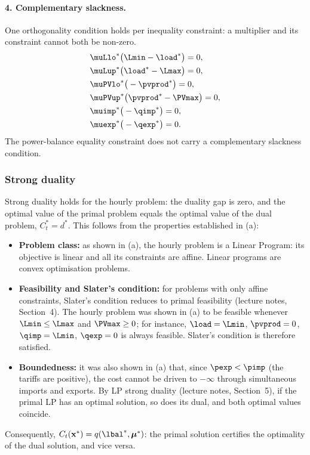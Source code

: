\paragraph{4. Complementary slackness.}
One orthogonality condition holds per inequality constraint: a multiplier and its constraint
cannot both be non-zero.
\begin{align}
    & {\muLlo}^* \big( \Lmin - {\load}^* \big) = 0, \label{eq:kkt_cs_load_lb} \\
    & {\muLup}^* \big( {\load}^* - \Lmax \big) = 0, \label{eq:kkt_cs_load_ub} \\
    & {\muPVlo}^* \big( -{\pvprod}^* \big) = 0, \label{eq:kkt_cs_pv_lb} \\
    & {\muPVup}^* \big( {\pvprod}^* - \PVmax \big) = 0, \label{eq:kkt_cs_pv_ub} \\
    & {\muimp}^* \big( -{\qimp}^* \big) = 0, \label{eq:kkt_cs_imp} \\
    & {\muexp}^* \big( -{\qexp}^* \big) = 0. \label{eq:kkt_cs_exp}
\end{align}
The power-balance equality constraint does not carry a complementary slackness condition.

\subsubsection{Strong duality}
Strong duality holds for the hourly problem: the duality gap is zero, and the optimal value
of the primal problem equals the optimal value of the dual problem, $C_t^* = d^*$. This
follows from the properties established in (a):
\begin{itemize}
    \item \textbf{Problem class:} as shown in (a), the hourly problem is a Linear Program:
    its objective is linear and all its constraints are affine. Linear programs are convex
    optimisation problems.
    \item \textbf{Feasibility and Slater's condition:} for problems with only affine
    constraints, Slater's condition reduces to primal feasibility (lecture notes,
    Section~4). The hourly problem was shown in (a) to be feasible whenever
    $\Lmin \leq \Lmax$ and $\PVmax \geq 0$; for instance, $\load = \Lmin$, $\pvprod = 0$,
    $\qimp = \Lmin$, $\qexp = 0$ is always feasible. Slater's condition is therefore satisfied.
    \item \textbf{Boundedness:} it was also shown in (a) that, since $\pexp < \pimp$ (the
    tariffs are positive), the cost cannot be driven to $-\infty$ through simultaneous
    imports and exports. By LP strong duality (lecture notes, Section~5), if the primal LP
    has an optimal solution, so does its dual, and both optimal values coincide.
\end{itemize}
Consequently, $C_t({\mathbf{x}}^*) = q({\lbal}^*, \boldsymbol{\mu}^*)$: the primal solution
certifies the optimality of the dual solution, and vice versa.

